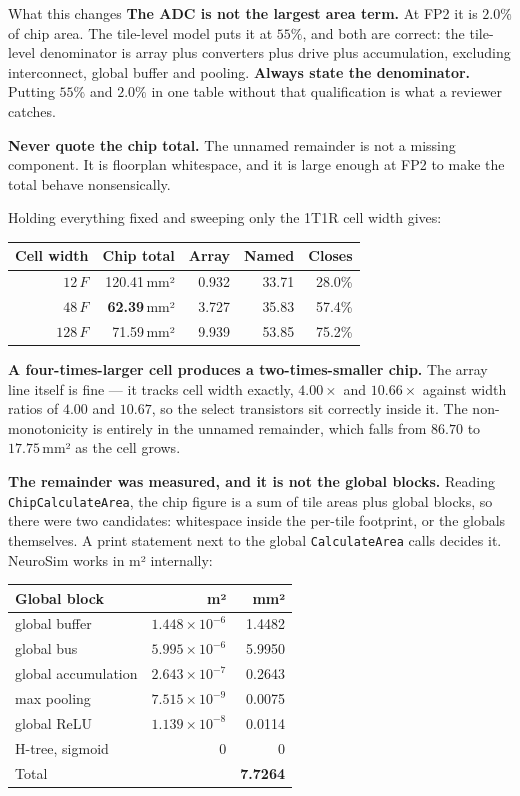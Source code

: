 \documentclass[11pt,a4paper]{report}
\begin{document}
\begin{keybox}{What this changes}
\textbf{The ADC is not the largest area term.} At FP2 it is $2.0\%$ of chip
area. The tile-level model puts it at $55\%$, and both are correct: the
tile-level denominator is array plus converters plus drive plus accumulation,
excluding interconnect, global buffer and pooling. \textbf{Always state the
denominator.} Putting $55\%$ and $2.0\%$ in one table without that
qualification is what a reviewer catches.

\textbf{Never quote the chip total.} The unnamed remainder is not a missing
component. It is floorplan whitespace, and it is large enough at FP2 to make
the total behave nonsensically.

Holding everything fixed and sweeping only the 1T1R cell width gives:

\begin{center}\small
\begin{tabular}{rrrrr}
\toprule
Cell width & Chip total & Array & Named & Closes \\
\midrule
$12\,F$  & 120.41\,mm² & 0.932 & 33.71 & 28.0\% \\
$48\,F$  &  \textbf{62.39}\,mm² & 3.727 & 35.83 & 57.4\% \\
$128\,F$ &  71.59\,mm² & 9.939 & 53.85 & 75.2\% \\
\bottomrule
\end{tabular}
\end{center}

\textbf{A four-times-larger cell produces a two-times-smaller chip.} The array
line itself is fine --- it tracks cell width exactly, $4.00\times$ and
$10.66\times$ against width ratios of $4.00$ and $10.67$, so the select
transistors sit correctly inside it. The non-monotonicity is entirely in the
unnamed remainder, which falls from $86.70$ to $17.75$\,mm² as the cell grows.

\textbf{The remainder was measured, and it is not the global blocks.} Reading
\texttt{ChipCalculateArea}, the chip figure is a sum of tile areas plus global
blocks, so there were two candidates: whitespace inside the per-tile footprint,
or the globals themselves. A print statement next to the global
\texttt{CalculateArea} calls decides it. NeuroSim works in m² internally:

\begin{center}\small
\begin{tabular}{lrr}
\toprule
Global block & m² & mm² \\
\midrule
global buffer & $1.448\times10^{-6}$ & 1.4482 \\
global bus    & $5.995\times10^{-6}$ & 5.9950 \\
global accumulation & $2.643\times10^{-7}$ & 0.2643 \\
max pooling   & $7.515\times10^{-9}$ & 0.0075 \\
global ReLU   & $1.139\times10^{-8}$ & 0.0114 \\
H-tree, sigmoid & 0 & 0 \\
\midrule
Total         &                      & \textbf{7.7264} \\
\bottomrule
\end{tabular}
\end{center}


\end{keybox}
\end{document}
